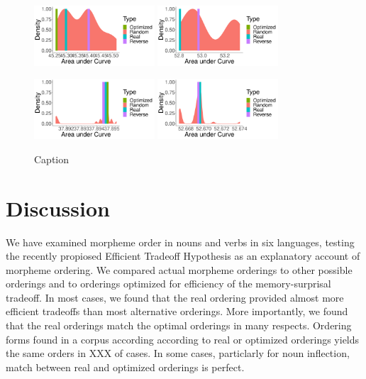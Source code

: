 \documentclass[11pt,letterpaper]{article}
\begin{document}
\begin{figure}
    \centering
    \includegraphics[width=0.4\textwidth]{figures/Hungarian-suffixes-byMorphemes-auc-hist-heldout-Coarse-FineSurprisal-optimized.pdf}
    \includegraphics[width=0.4\textwidth]{figures/Hungarian-suffixes-byMorphemes-auc-hist-heldout-Nouns-Coarse-FineSurprisal-optimized.pdf}
    
    \includegraphics[width=0.4\textwidth]{figures/Turkish-suffixes-byMorphemes-auc-hist-heldout-Coarse-FineSurprisal-optimized.pdf}
    \includegraphics[width=0.4\textwidth]{figures/Turkish-suffixes-byMorphemes-auc-hist-heldout-Nouns-Coarse-FineSurprisal-optimized.pdf}
    \caption{Caption}
    \label{fig:my-label}
\end{figure}

\section{Discussion}

We have examined morpheme order in nouns and verbs in six languages, testing the recently propiosed Efficient Tradeoff Hypothesis \citep{hahn2020modeling} as an explanatory account of morpheme ordering.
We compared actual morpheme orderings to other possible orderings and to orderings optimized for efficiency of the memory-surprisal tradeoff.
In most cases, we found that the real ordering provided almost more efficient tradeoffs than most alternative orderings.
More importantly, we found that the real orderings match the optimal orderings in many respects.
Ordering forms found in a corpus according according to real or optimized orderings yields the same orders in XXX of cases.
In some cases, particlarly for noun inflection, match between real and optimized orderings is perfect.
\end{document}
